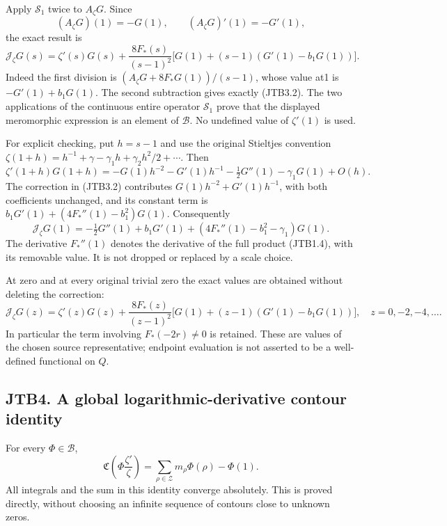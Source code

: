Apply \(\mathscr S_1\) twice to \(A_\zeta G\). Since \[
(A_\zeta G)(1)=-G(1),\qquad
(A_\zeta G)'(1)=-G'(1),
\tag{JTB3.1}
\] the exact result is \[
\boxed{
\mathscr J_\zeta G(s)=\zeta'(s)G(s)
+\frac{8F_*(s)}{(s-1)^2}
\bigl[G(1)+(s-1)(G'(1)-b_1G(1))\bigr].}
\tag{JTB3.2}
\] Indeed the first division is \((A_\zeta G+8F_*G(1))/(s-1)\), whose
value at1 is \(-G'(1)+b_1G(1)\). The second subtraction gives exactly
(JTB3.2). The two applications of the continuous entire operator
\(\mathscr S_1\) prove that the displayed meromorphic expression is an
element of \(\mathcal B\). No undefined value of \(\zeta'(1)\) is used.

For explicit checking, put \(h=s-1\) and use the original Stieltjes
convention \(\zeta(1+h)=h^{-1}+\gamma-\gamma_1h+\gamma_2h^2/2+\cdots\).
Then \[
\zeta'(1+h)G(1+h)
=-G(1)h^{-2}-G'(1)h^{-1}
-\tfrac12G''(1)-\gamma_1G(1)+O(h).
\tag{JTB3.3}
\] The correction in (JTB3.2) contributes \(G(1)h^{-2}+G'(1)h^{-1}\),
with both coefficients unchanged, and its constant term is
\(b_1G'(1)+(4F_*''(1)-b_1^2)G(1)\). Consequently \[
\mathscr J_\zeta G(1)=-\tfrac12G''(1)+b_1G'(1)
+(4F_*''(1)-b_1^2-\gamma_1)G(1).
\tag{JTB3.4}
\] The derivative \(F_*''(1)\) denotes the derivative of the full
product (JTB1.4), with its removable value. It is not dropped or
replaced by a scale choice.

At zero and at every original trivial zero the exact values are obtained
without deleting the correction: \[
\mathscr J_\zeta G(z)=\zeta'(z)G(z)
+\frac{8F_*(z)}{(z-1)^2}
\bigl[G(1)+(z-1)(G'(1)-b_1G(1))\bigr],
\quad z=0,-2,-4,\ldots.
\tag{JTB3.5}
\] In particular the term involving \(F_*(-2r)\ne0\) is retained. These
are values of the chosen source representative; endpoint evaluation is
not asserted to be a well-defined functional on \(Q\).

\subsection{JTB4. A global logarithmic-derivative contour
identity}\label{jtb4.-a-global-logarithmic-derivative-contour-identity}

For every \(\Phi\in\mathcal B\), \[
\boxed{\mathfrak C\!\left(\Phi\frac{\zeta'}\zeta\right)
=\sum_{\rho\in\mathscr Z}m_\rho\Phi(\rho)-\Phi(1).}
\tag{JTB4.1}
\] All integrals and the sum in this identity converge absolutely. This
is proved directly, without choosing an infinite sequence of contours
close to unknown zeros.

